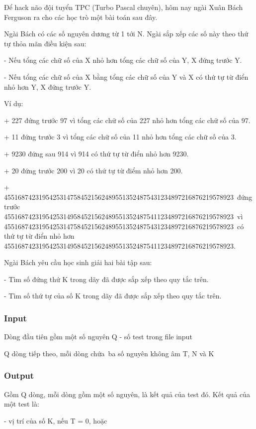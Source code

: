 

Để hack não đội tuyển TPC (Turbo Pascal chuyên), hôm nay ngài Xuân Bách Ferguson ra cho các học trò một bài toán sau đây.

Ngài Bách có các số nguyên dương từ 1 tới N. Ngài sắp xếp các số này theo thứ tự thỏa mãn điều kiện sau:

- Nếu tổng các chữ số của X nhỏ hơn tổng các chữ số của Y, X đứng trước Y.

- Nếu tổng các chữ số của X bằng tổng các chữ số của Y và X có thứ tự từ điển nhỏ hơn Y, X đứng trước Y.

Ví dụ:

+ 227 đứng trước 97 vì tổng các chữ số của 227 nhỏ hơn tổng các chữ số của 97.

+ 11 đứng trước 3 vì tổng các chữ số của 11 nhỏ hơn tổng các chữ số của 3.

+ 9230 đứng sau 914 vì 914 có thứ tự từ điển nhỏ hơn 9230.

+ 20 đứng trước 200 vì 20 có thứ tự từ điểm nhỏ hơn 200.

+ 455168742319542531475845215624895513524875431234897216876219578923 đứng trước 455168742319542531495845215624895513524875411234897216876219578923 vì 455168742319542531475845215624895513524875431234897216876219578923 có thứ tự từ điển nhỏ hơn 455168742319542531495845215624895513524875411234897216876219578923.

Ngài Bách yêu cầu học sinh giải hai bài tập sau:

- Tìm số đứng thứ K trong dãy đã được sắp xếp theo quy tắc trên.

- Tìm số thứ tự của số K trong dãy đã được sắp xếp theo quy tắc trên.

\subsubsection{Input}

Dòng đầu tiên gồm một số nguyên Q - số test trong file input

Q dòng tiếp theo, mỗi dòng chứa ba số nguyên không âm T, N và K

\subsubsection{Output}

Gồm Q dòng, mỗi dòng gồm một số nguyên, là kết quả của test đó. Kết quả của một test là:

- vị trí của số K, nếu T = 0, hoặc

